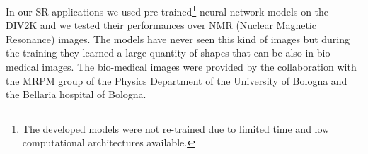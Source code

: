 \documentclass{standalone}
\begin{document}
In our SR applications we used pre-trained\footnote{
  The developed models were not re-trained due to limited time and low computational architectures available.
} neural network models on the DIV2K and we tested their performances over NMR (Nuclear Magnetic Resonance) images.
The models have never seen this kind of images but during the training they learned a large quantity of shapes that can be  also in bio-medical images.
The bio-medical images were provided by the collaboration with the MRPM group of the Physics Department of the University of Bologna and the Bellaria hospital of Bologna.
\end{document}
